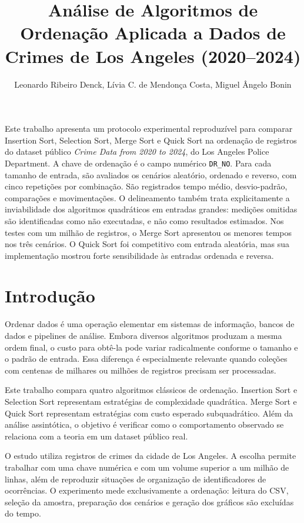 \documentclass[12pt]{article}
\title{Análise de Algoritmos de Ordenação Aplicada a Dados de Crimes de Los Angeles (2020--2024)}
\author{
  Leonardo Ribeiro Denck\inst{1},
  Lívia C. de Mendonça Costa\inst{1},
  Miguel Ângelo Bonin\inst{1}
}
\begin{document}
\maketitle

\begin{resumo}
Este trabalho apresenta um protocolo experimental reproduzível para comparar
Insertion Sort, Selection Sort, Merge Sort e Quick Sort na ordenação de registros
do dataset público \textit{Crime Data from 2020 to 2024}, do Los Angeles Police
Department. A chave de ordenação é o campo numérico \texttt{DR\_NO}. Para cada
tamanho de entrada, são avaliados os cenários aleatório, ordenado e reverso, com
cinco repetições por combinação. São registrados tempo médio, desvio-padrão,
comparações e movimentações. O delineamento também trata explicitamente a
inviabilidade dos algoritmos quadráticos em entradas grandes: medições omitidas
são identificadas como não executadas, e não como resultados estimados.
Nos testes com um milhão de registros, o Merge Sort apresentou os menores
tempos nos três cenários. O Quick Sort foi competitivo com entrada aleatória,
mas sua implementação mostrou forte sensibilidade às entradas ordenada e
reversa.
\end{resumo}

\section{Introdução}

Ordenar dados é uma operação elementar em sistemas de informação, bancos de
dados e pipelines de análise. Embora diversos algoritmos produzam a mesma
ordem final, o custo para obtê-la pode variar radicalmente conforme o tamanho e
o padrão de entrada. Essa diferença é especialmente relevante quando coleções
com centenas de milhares ou milhões de registros precisam ser processadas.

Este trabalho compara quatro algoritmos clássicos de ordenação. Insertion Sort
e Selection Sort representam estratégias de complexidade quadrática. Merge Sort
e Quick Sort representam estratégias com custo esperado subquadrático. Além da
análise assintótica, o objetivo é verificar como o comportamento observado se
relaciona com a teoria em um dataset público real.

O estudo utiliza registros de crimes da cidade de Los Angeles. A escolha permite
trabalhar com uma chave numérica e com um volume superior a um milhão de linhas,
além de reproduzir situações de organização de identificadores de ocorrências.
O experimento mede exclusivamente a ordenação: leitura do CSV, seleção da
amostra, preparação dos cenários e geração dos gráficos são excluídas do tempo.
\end{document}
